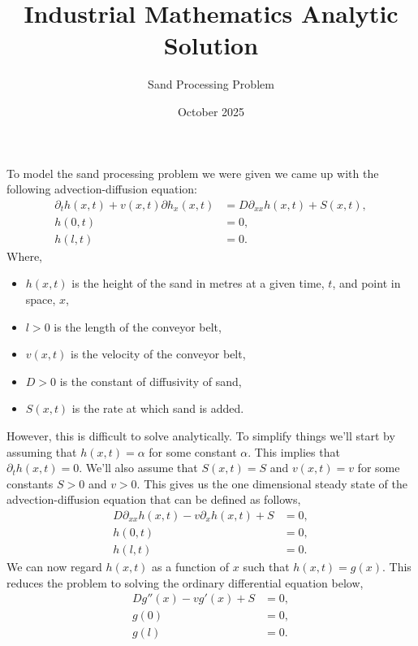 \documentclass{article}
\title{Industrial Mathematics Analytic Solution}
\author{Sand Processing Problem}
\date{October 2025}
\begin{document}
\maketitle

To model the sand processing problem we were given we came up with the following advection-diffusion equation:
\begin{equation}
\begin{split}
    \partial_th(x,t) + v(x,t)\partial h_x(x,t) &= D \partial_{xx}h(x,t) + S(x,t),\\ 
    h(0,t) &= 0, \\
    h(l,t) &= 0.
\end{split}
\end{equation}
Where,
\begin{itemize}
    \item $h(x,t)$ is the height of the sand in metres at a given time, $t$, and point in space, $x$,
    \item $l > 0$ is the length of the conveyor belt,
    \item $v(x,t)$ is the velocity of the conveyor belt,
    \item $D>0$ is the constant of diffusivity of sand,
    \item $S(x,t)$ is the rate at which sand is added.
\end{itemize}
However, this is difficult to solve analytically. To simplify things we'll start by assuming that $h(x,t) = \alpha$ for some constant $\alpha$. This implies that $\partial_th(x,t) = 0$. We'll also assume that $S(x,t) = S$ and $v(x,t) = v$ for some constants $S>0$ and $v>0$. This gives us the one dimensional steady state of the advection-diffusion equation that can be defined as follows, 
\begin{equation}
    \begin{split}
    D\partial_{xx}h(x,t)-v\partial_xh(x,t)+S&=0, \\
    h(0,t)&=0,\\
    h(l,t)&=0.
    \end{split}
\end{equation}
We can now regard $h(x,t)$ as a function of $x$ such that $h(x,t) = g(x)$. This reduces the problem to solving the ordinary differential equation below, 
\begin{equation}
    \begin{split}
        Dg''(x)-vg'(x)+S&=0, \\
        g(0)&=0,\\
        g(l)&=0.
    \end{split}
\end{equation}
\end{document}
